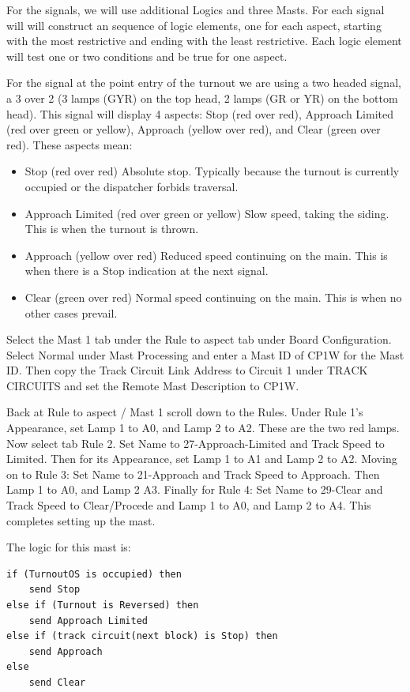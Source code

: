 For the signals, we will use additional Logics and three Masts.  For each 
signal will will construct an sequence of logic elements, one for each aspect, 
starting with the most restrictive and ending with the least restrictive.  
Each logic element will test one or two conditions and be true for one aspect.

For the signal at the point entry of the turnout we are using a two headed
signal, a 3 over 2 (3 lamps (GYR) on the top head, 2 lamps (GR or YR) on the
bottom head). This signal will display 4 aspects: Stop (red over red),
Approach Limited (red over green or yellow), Approach (yellow over red), and 
Clear (green over red).  These aspects mean: 

\begin{itemize}
\item Stop (red over red) Absolute stop.  Typically because the turnout is 
currently occupied or the dispatcher forbids traversal.
\item Approach Limited (red over green or yellow) Slow speed, taking the 
siding.  This is when the turnout is thrown.
\item Approach (yellow over red) Reduced speed continuing on the main.  This 
is when there is a Stop indication at the next signal.
\item  Clear (green over red) Normal speed continuing on the main.  This is 
when no other cases prevail.
\end{itemize}

Select the Mast 1 tab under the Rule to aspect tab under Board Configuration. 
Select Normal under Mast Processing and enter a Mast ID of CP1W for the Mast 
ID.  Then copy the Track Circuit Link Address to Circuit 1 under TRACK 
CIRCUITS and set the Remote Mast Description  to CP1W.

Back at Rule to aspect / Mast 1 scroll down to the Rules. Under Rule 1's
Appearance, set Lamp 1 to A0, and Lamp 2 to A2. These are the two red lamps.
Now select tab Rule 2.  Set Name to 27-Approach-Limited and Track Speed to 
Limited.  Then for its Appearance, set Lamp 1 to A1 and Lamp 2 to A2. Moving 
on to Rule 3: Set Name to 21-Approach and Track Speed to Approach.  Then Lamp 
1 to A0, and Lamp 2 A3.  Finally for Rule 4: Set Name to 29-Clear and Track 
Speed to Clear/Procede and Lamp 1 to A0, and Lamp 2 to A4. This completes 
setting up the mast.

The logic for this mast is:

\begin{verbatim}
if (TurnoutOS is occupied) then
    send Stop
else if (Turnout is Reversed) then
    send Approach Limited
else if (track circuit(next block) is Stop) then
    send Approach
else
    send Clear
\end{verbatim}

